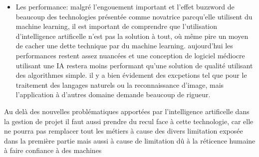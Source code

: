 \begin{itemize}
        \item Les performance: malgré l'engouement important et l'effet buzzword de beaucoup 
            des technologies présentée comme novatrice parcqu'elle utilisent du machine learning,
            il est important de comprendre que l'utilisation d'intelligence artificelle n'est pas la 
            solution à tout, où même pire un moyen de cacher une dette technique par du machine learning.
            aujourd'hui les performances restent assez nuancées et une conception de logiciel médiocre 
            utilisant une IA restera moins performant qu'une solution de qualité utilisant des algorithmes 
            simple. il y a bien évidement des excpetions tel que pour le traitement des langages naturels
            ou la reconnaissance d'image, mais l'application à d'autres domaine demande beaucoup de rigueur. 
            \newline
    \end{itemize}

    Au delà des nouvelles problématiques apportées par l'intelligence artificelle dans la gestion de projet
    il faut aussi prendre du recul face à cette technologie, car elle ne pourra pas remplacer 
    tout les métiers à cause des divers limitation exposée dans la première partie 
    mais aussi à cause de limitation dû à la réticence humaine à faire confiance à des machines   
    \newpage


